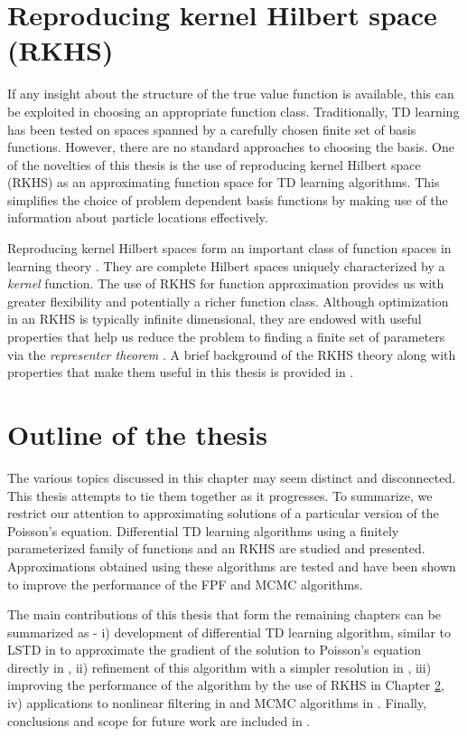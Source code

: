 \section{Reproducing kernel Hilbert space (RKHS)}
 If any insight about the structure of the true value function is available, this can be exploited in choosing an appropriate function class. Traditionally, TD learning has been tested on spaces spanned by a carefully chosen finite set of basis functions. However, there are no standard approaches to choosing the basis. One of the novelties of this thesis is the use of reproducing kernel Hilbert space (RKHS) as an approximating function space for TD learning algorithms. This simplifies the choice of problem dependent basis functions by making use of the information about particle locations effectively. 
 
Reproducing kernel Hilbert spaces form an important class of function spaces in learning theory \cite{aro50, schsmo01}. They are complete Hilbert spaces uniquely characterized by a \textit{kernel} function. The use of RKHS for function approximation provides us with greater flexibility and potentially a richer function class. Although optimization in an RKHS is typically infinite dimensional, they are endowed with useful properties that help us reduce the problem to finding a finite set of parameters via the \textit{representer theorem} \cite{kimwah71, schhersmo01}. A brief background of the RKHS theory along with properties that make them useful in this thesis is provided in \Chapter{}. 
 

\section{Outline of the thesis}
The various topics discussed in this chapter may seem distinct and disconnected. This thesis attempts to tie them together as it progresses. To summarize, we restrict our attention to approximating solutions of a particular version of the Poisson's equation. Differential TD learning algorithms using a finitely parameterized family of functions and an RKHS are studied and presented. Approximations obtained using these algorithms are tested and have been shown to improve the performance of the FPF and MCMC algorithms. 

The main contributions of this thesis that form the remaining chapters can be summarized as - i) development of differential TD learning algorithm, similar to LSTD in \cite{ctcn} to approximate the gradient of the solution to Poisson's equation directly in , ii) refinement of this algorithm with a simpler resolution \cite{radmey18a} in \Chapter{}, iii) improving the performance of the algorithm by the use of RKHS in Chapter \ref{}, iv) applications to nonlinear filtering in \Chapter{} and MCMC algorithms in \Chapter{}. Finally, conclusions and scope for future work are included in \Chapter{}.  


